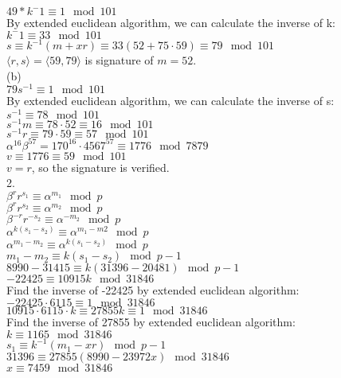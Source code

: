 \documentclass{article}
\begin{document}
$49*k^-1\equiv 1\mod 101$\\
By extended euclidean algorithm, we can calculate the inverse of k:\\
$k^-1\equiv 33\mod 101$\\
$s \equiv k^{-1}(m+xr) \equiv 33(52+75\cdot59)\equiv 79 \mod 101$\\
$\langle r,s\rangle=\langle 59,79\rangle$  is signature of $m=52$.\\
(b)\\
$79s^{-1} \equiv 1\mod 101$\\
By extended euclidean algorithm, we can calculate the inverse of s:\\
$s^{-1}\equiv 78\mod 101$\\
$s^{-1}m \equiv 78\cdot52 \equiv 16 \mod 101$\\
$s^{-1}r \equiv 79\cdot59 \equiv 57 \mod 101$\\
$\alpha^{16}\beta^{57}=170^{16}\cdot 4567^{57} \equiv 1776 \mod 7879$\\
$v \equiv 1776 \equiv 59 \mod 101$\\
$v=r$, so the signature is verified.\\
2.\\
$\beta^r r^{s_1} \equiv \alpha^{m_1} \mod p$\\
$\beta^r r^{s_2} \equiv \alpha^{m_2} \mod p$\\
$\beta^{-r} r^{-s_2} \equiv \alpha^{-m_2} \mod p$\\
$\alpha^{k(s_1-s_2)} \equiv \alpha^{m_1-m2} \mod p$\\
$\alpha^{m_1-m_2} \equiv \alpha^{k(s_1-s_2)} \mod p$\\
$m_1-m_2 \equiv k(s_1-s_2) \mod p-1$\\
$8990-31415 \equiv k(31396-20481) \mod p-1$\\
$-22425 \equiv 10915k \mod 31846$\\
Find the inverse of -22425 by extended euclidean algorithm:\\
$-22425 \cdot 6115 \equiv 1 \mod 31846$\\
$10915 \cdot 6115 \cdot k \equiv 27855k \equiv 1 \mod 31846$\\
Find the inverse of 27855 by extended euclidean algorithm:\\
$k \equiv 1165 \mod 31846$\\
$s_1 \equiv k^{-1}(m_1-xr) \mod p-1$\\
$31396 \equiv 27855(8990-23972x) \mod 31846$\\
$x\equiv 7459\mod 31846$\\
\end{document}
